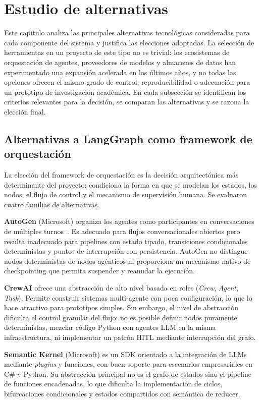 \section{Estudio de alternativas}
\label{sec:alternativas}

Este capítulo analiza las principales alternativas tecnológicas consideradas para cada componente del sistema y justifica las elecciones adoptadas. La selección de herramientas en un proyecto de este tipo no es trivial: los ecosistemas de orquestación de agentes, proveedores de modelos y almacenes de datos han experimentado una expansión acelerada en los últimos años, y no todas las opciones ofrecen el mismo grado de control, reproducibilidad o adecuación para un prototipo de investigación académica. En cada subsección se identifican los criterios relevantes para la decisión, se comparan las alternativas y se razona la elección final.


\subsection{Alternativas a LangGraph como framework de orquestación}
\label{sec:alt-langgraph}

La elección del framework de orquestación es la decisión arquitectónica más determinante del proyecto: condiciona la forma en que se modelan los estados, los nodos, el flujo de control y el mecanismo de supervisión humana. Se evaluaron cuatro familias de alternativas.

\textbf{AutoGen} (Microsoft) organiza los agentes como participantes en conversaciones de múltiples turnos~\cite{wu2023autogen}. Es adecuado para flujos conversacionales abiertos pero resulta inadecuado para pipelines con estado tipado, transiciones condicionales deterministas y puntos de interrupción con persistencia. AutoGen no distingue nodos deterministas de nodos agénticos ni proporciona un mecanismo nativo de checkpointing que permita suspender y reanudar la ejecución.

\textbf{CrewAI} ofrece una abstracción de alto nivel basada en roles (\emph{Crew}, \emph{Agent}, \emph{Task}). Permite construir sistemas multi-agente con poca configuración, lo que lo hace atractivo para prototipos simples. Sin embargo, el nivel de abstracción dificulta el control granular del flujo: no es posible definir nodos puramente deterministas, mezclar código Python con agentes LLM en la misma infraestructura, ni implementar un patrón HITL mediante interrupción del grafo.

\textbf{Semantic Kernel} (Microsoft) es un SDK orientado a la integración de LLMs mediante \emph{plugins} y funciones, con buen soporte para escenarios empresariales en C\# y Python. Su abstracción principal no es el grafo de estados sino el pipeline de funciones encadenadas, lo que dificulta la implementación de ciclos, bifurcaciones condicionales y estados compartidos con semántica de reducer.

